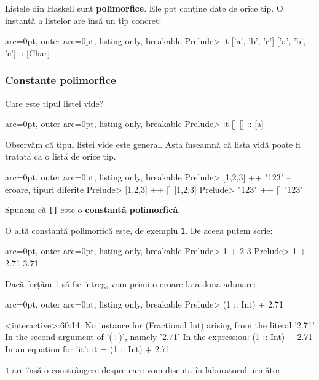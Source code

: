 Listele din Haskell sunt \textbf{polimorfice}. Ele pot conține date de orice tip. O instanță a listelor are însă un tip concret:


\begin{tcblisting}{ arc=0pt, outer arc=0pt, listing only, breakable}
Prelude> :t ['a', 'b', 'c']
['a', 'b', 'c'] :: [Char]

\end{tcblisting}


\subsubsection*{ Constante polimorfice }

Care este tipul listei vide?


\begin{tcblisting}{ arc=0pt, outer arc=0pt, listing only, breakable}
Prelude> :t []
[] :: [a]

\end{tcblisting}


Observăm că tipul listei vide este general. Asta înseamnă că lista vidă poate fi tratată ca o listă de orice tip.


\begin{tcblisting}{ arc=0pt, outer arc=0pt, listing only, breakable}
Prelude> [1,2,3] ++ "123" -- eroare, tipuri diferite
Prelude> [1,2,3] ++ []
[1,2,3]
Prelude> "123" ++ []
"123"

\end{tcblisting}


Spunem că \texttt{[]} este o \textbf{constantă polimorfică}.

\begin{tcolorbox}[colback=blue!10, colframe=blue!20]
O altă constantă polimorfică este, de exemplu \texttt{1}. De aceea putem scrie:


\begin{tcblisting}{ arc=0pt, outer arc=0pt, listing only, breakable}
Prelude> 1 + 2
3
Prelude> 1 + 2.71
3.71

\end{tcblisting}


Dacă forțăm 1 să fie întreg, vom primi o eroare la a doua adunare:

\begin{tcblisting}{ arc=0pt, outer arc=0pt, listing only, breakable}
Prelude> (1 :: Int) + 2.71

<interactive>:60:14:
    No instance for (Fractional Int) arising from the literal '2.71'
    In the second argument of '(+)', namely '2.71'
    In the expression: (1 :: Int) + 2.71
    In an equation for 'it': it = (1 :: Int) + 2.71

\end{tcblisting}


\texttt{1} are însă o constrângere despre care vom discuta în laboratorul următor.
\end{tcolorbox}


